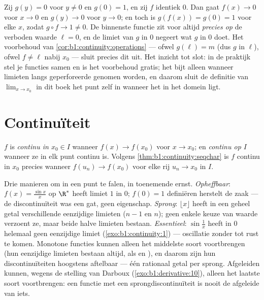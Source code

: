 \begin{example}\label{ex:b1:continuity:compositiontrap}
Zij $g(y) = 0$ voor $y \neq 0$ en $g(0) = 1$, en zij $f$ identiek $0$.
Dan gaat $f(x) \to 0$ voor $x \to 0$ en $g(y) \to 0$ voor $y \to 0$; en
toch is $g(f(x)) = g(0) = 1$ voor elke $x$, zodat $g \circ f \to 1 \neq
0$. De binnenste functie zit voor altijd \emph{precies op} de verboden
waarde $\ell = 0$, en de limiet van $g$ in $0$ negeert wat $g$ in $0$
doet. Het voorbehoud van \cref{cor:b1:continuity:operations} --- ofwel
$g(\ell) = m$ (dus $g$  in $\ell$), ofwel $f \neq \ell$ nabij
$x_0$ --- sluit precies dit uit. Het inzicht tot slot: in de praktijk
stel je \emph{} functies samen en is het voorbehoud gratis; het
bijt alleen wanneer limieten langs geperforeerde  genomen
worden, en daarom sluit de definitie van $\lim_{x \to x_0}$ in dit boek
het punt zelf in wanneer het in het domein ligt.
\end{example}

\section{Continuïteit}

\begin{definition}\label{def:b1:continuity:continuous}
$f$ is \emph{continu in $x_0 \in I$} wanneer $f(x)
\to f(x_0)$ voor $x \to x_0$; en \emph{continu op $I$} wanneer ze in elk
punt continu is. Volgens \cref{thm:b1:continuity:seqchar} is $f$ continu
in $x_0$ precies wanneer $f(u_n) \to f(x_0)$ voor elke rij $u_n \to x_0$
in $I$.
\end{definition}

\begin{example}\label{ex:b1:continuity:taxonomy}
Drie manieren om in een punt te falen, in toenemende ernst.
\emph{Opheffbaar}: $f(x) = \frac{\sin x}{x}$ op $\R^*$ heeft limiet $1$
in $0$; $f(0) = 1$ definiëren herstelt de zaak --- de discontinuïteit was
een gat, geen eigenschap. \emph{Sprong}: $\lfloor x \rfloor$ heeft in een
geheel getal verschillende eenzijdige limieten ($n - 1$ en $n$); geen
enkele keuze van waarde verzoent ze, maar beide halve limieten bestaan.
\emph{Essentieel}: $\sin\frac1x$ heeft in $0$ helemaal geen eenzijdige
limiet (\cref{exo:b1:continuity:1}) --- oscillatie zonder tot rust te
komen. Monotone functies kunnen alleen het middelste soort voortbrengen
(hun eenzijdige limieten bestaan altijd, als  en ), en
daarom zijn hun  discontinuïteiten hoogstens aftelbaar ---
één rationaal getal per sprong. Afgeleiden kunnen, wegens de stelling van
Darboux (\cref{exo:b1:derivative:10}), alleen het laatste soort
voortbrengen: een functie met een sprongdiscontinuïteit is nooit de
afgeleide van iets.
\end{example}

